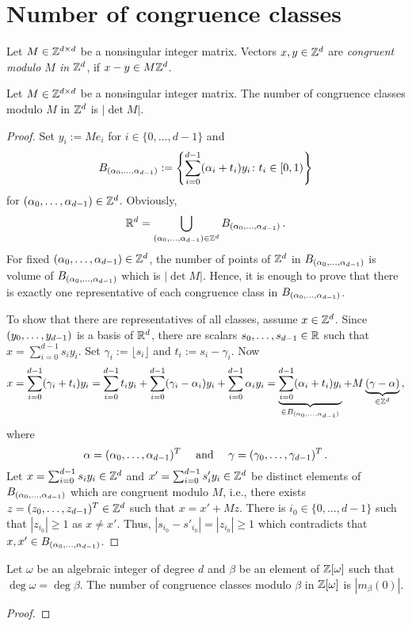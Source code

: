 \section{Number of congruence classes}

\begin{defn}
Let $M\in\mathbb{Z}^{d\times d}$ be a nonsingular integer matrix. Vectors $x,y \in \mathbb{Z}^d$ are \emph{congruent modulo $M$ in $\mathbb{Z}^d$}, if $x-y \in M\mathbb{Z}^d$.
\end{defn}

\begin{lem}
Let $M\in\mathbb{Z}^{d\times d}$ be a nonsingular integer matrix. The number of congruence classes modulo $M$ in $\mathbb{Z}^d$ is $|\det M|$.
\end{lem}
\begin{proof}
Set $y_i:=M e_i$ for $i\in\{0, \dots, d-1 \}$ and 
$$
B_{({\alpha}_0,\ldots,{\alpha}_{d-1})}:=\left\{\sum_{i=0}^{d-1} (\alpha_i + t_i) y_i \colon t_i \in [0,1)\right\}
$$
for $({\alpha}_0,\ldots,{\alpha}_{d-1}) \in \mathbb{Z}^d$. Obviously,
$$
\mathbb{R}^d=\bigcup_{({\alpha}_0,\ldots,{\alpha}_{d-1}) \in \mathbb{Z}^d} B_{({\alpha}_0,\ldots,{\alpha}_{d-1})}\,.
$$
For fixed $({\alpha}_0,\ldots,{\alpha}_{d-1}) \in \mathbb{Z}^d$, the number of points of $\mathbb{Z}^d$ in $B_{({\alpha}_0,\ldots,{\alpha}_{d-1})}$  is volume of $B_{({\alpha}_0,\ldots,{\alpha}_{d-1})}$  which is $|\det M|$. Hence, it is enough to prove that there is exactly one representative of each congruence class in $B_{({\alpha}_0,\ldots,{\alpha}_{d-1})}$. 

To show that there are representatives of all classes, assume $x\in\mathbb{Z}^d$. Since $({y}_0,\ldots,{y}_{d-1})$ is a basis of $\mathbb{R}^d$, there are scalars $s_0, \dots, s_{d-1}\in \mathbb{R}$ such that $x= \sum_{i=0}^{d-1} s_i y_i$. Set $\gamma_i:=\lfloor s_i \rfloor$ and $t_i:=s_i-\gamma_i$. Now
\begin{align*}
 x=\sum_{i=0}^{d-1} (\gamma_i+t_i) y_i=\sum_{i=0}^{d-1}t_i y_i +\sum_{i=0}^{d-1} (\gamma_i-\alpha_i)y_i + \sum_{i=0}^{d-1} \alpha_i y_i=\underbrace{\sum_{i=0}^{d-1} (\alpha_i+t_i)y_i}_{\in B_{({\alpha}_0,\ldots,{\alpha}_{d-1})} } +M\underbrace{(\gamma-\alpha)}_{\in\mathbb{Z}^d}\,,
\end{align*}
where
$$
\alpha=({\alpha}_0,\ldots,{\alpha}_{d-1})^T \quad \text{ and }\quad \gamma=({\gamma}_0,\ldots,{\gamma}_{d-1})^T\,.
$$
Let $x=\sum_{i=0}^{d-1} s_i y_i \in \mathbb{Z}^d$ and $x'=\sum_{i=0}^{d-1}s'_i y_i \in \mathbb{Z}^d$ be distinct elements of $B_{({\alpha}_0,\ldots,{\alpha}_{d-1})}$ which are congruent modulo $M$, i.e., there exists $z=({z}_0,\ldots,{z}_{d-1})^T\in\mathbb{Z}^d$ such that $x=x'+M z$. There is $i_0\in\{0, \dots , d-1\}$ such that $|z_{i_0}|\geq 1$ as $x\neq x'$. Thus, $|s_{i_0}-s'_{i_0}|=|z_{i_0}|\geq 1$ which contradicts that  $x, x'\in B_{({\alpha}_0,\ldots,{\alpha}_{d-1})}$.
\end{proof}

\begin{thm}
Let $\omega$ be an algebraic integer of degree $d$ and  $\beta$ be an element of $\mathbb{Z}[\omega]$ such that $\deg \omega = \deg\beta$. The number of congruence classes modulo $\beta$ in $\mathbb{Z}[\omega]$ is $|m_\beta(0)|$.
\end{thm}
\begin{proof}
\end{proof}